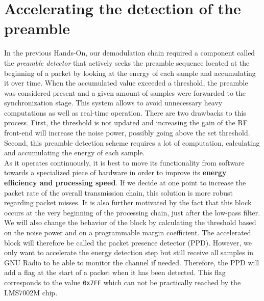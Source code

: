 \section{Accelerating the detection of the preamble}
In the previous Hands-On, our demodulation chain required a component called the \textit{preamble detector} that actively seeks the preamble sequence located at the beginning of a packet by looking at the energy of each sample and accumulating it over time. When the accumulated value exceeded a threshold, the preamble was considered present and a given amount of samples were forwarded to the synchronization stage. This system allows to avoid unnecessary heavy computations as well as real-time operation. There are two drawbacks to this process. First, the threshold is not updated and increasing the gain of the RF front-end will increase the noise power, possibly going above the set threshold. Second, this preamble detection scheme requires a lot of computation, calculating and accumulating the energy of each sample. \\

As it operates continuously, it is best to move its functionality from software towards a specialized piece of hardware in order to improve its \textbf{energy efficiency and processing speed}. If we decide at one point to increase the packet rate of the overall transmission chain, this solution is more robust regarding packet misses. It is also further motivated by the fact that this block occurs at the very beginning of the processing chain, just after the low-pass filter. We will also change the behavior of the block by calculating the threshold based on the noise power and on a programmable margin coefficient. The accelerated block will therefore be called the packet presence detector (PPD). However, we only want to accelerate the energy detection step but still receive all samples in GNU Radio to be able to monitor the channel if needed. Therefore, the PPD will add a flag at the start of a packet when it has been detected. This flag corresponds to the value \texttt{0x7FF} which can not be practically reached by the LMS7002M chip.


